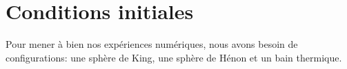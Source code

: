 





	\section{Conditions initiales}


		Pour mener à bien nos expériences numériques, nous avons besoin de configurations: une sphère de King,
		une sphère de Hénon et un bain thermique.

